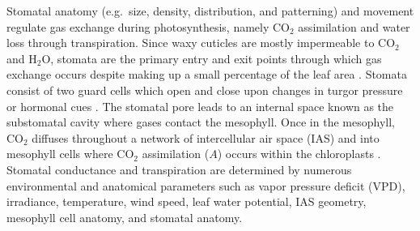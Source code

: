 \documentclass[webpdf,large,modern,unnumsec,namedate]{oup-authoring-template}
\begin{document}
Stomatal anatomy (e.g.~size, density, distribution, and patterning) and
movement regulate gas exchange during photosynthesis, namely CO\(_2\)
assimilation and water loss through transpiration. Since waxy cuticles
are mostly impermeable to CO\(_2\) and H\(_2\)O, stomata are the primary
entry and exit points through which gas exchange occurs despite making
up a small percentage of the leaf area \citep{lange_responses_1971}.
Stomata consist of two guard cells which open and close upon changes in
turgor pressure or hormonal cues \citep{mcadam_linking_2016}. The
stomatal pore leads to an internal space known as the substomatal cavity
where gases contact the mesophyll. Once in the mesophyll, CO\(_2\)
diffuses throughout a network of intercellular air space (IAS) and into
mesophyll cells where CO\(_2\) assimilation (\(A\)) occurs within the
chloroplasts \citep{lee_diffusion_1964}. Stomatal conductance and
transpiration are determined by numerous environmental and anatomical
parameters such as vapor pressure deficit (VPD), irradiance,
temperature, wind speed, leaf water potential, IAS geometry, mesophyll
cell anatomy, and stomatal anatomy.
\end{document}

